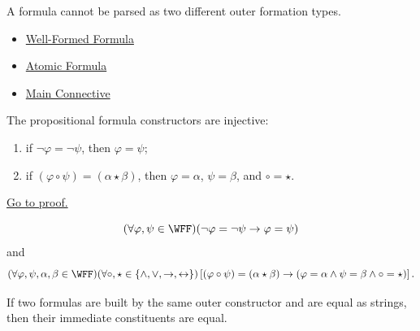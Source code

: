\begin{remark*}[Interpretation]
A formula cannot be parsed as two different outer formation types.
\end{remark*}

\begin{dependencies}
\begin{itemize}
  \item \hyperref[def:well-formed-formula]{Well-Formed Formula}
  \item \hyperref[def:atomic-formula-propositional-logic]{Atomic Formula}
  \item \hyperref[def:main-connective-propositional-logic]{Main Connective}
\end{itemize}
\end{dependencies}
\begin{tcolorbox}[colback=lembox, colframe=lemborder, arc=2pt,
  left=6pt, right=6pt, top=4pt, bottom=4pt,
  title={\small\textbf{Lemma (Constructor Injectivity for Propositional Formulas)}},
  fonttitle=\small\bfseries]
\begin{lemma}
\label{lem:constructor-injectivity-propositional-formulas}
The propositional formula constructors are injective:
\begin{enumerate}
\item if \(\neg\varphi=\neg\psi\), then \(\varphi=\psi\);
\item if \((\varphi\circ\psi)=(\alpha\star\beta)\), then \(\varphi=\alpha\), \(\psi=\beta\), and \(\circ=\star\).
\end{enumerate}

\noindent\hyperref[prf:constructor-injectivity-propositional-formulas]{Go to proof.}
\end{lemma}
\end{tcolorbox}

\begin{remark*}
\[
(\forall\varphi,\psi\in\WFF)
(\neg\varphi=\neg\psi\to\varphi=\psi)
\]
and
\[
(\forall\varphi,\psi,\alpha,\beta\in\WFF)
(\forall\circ,\star\in\{\land,\lor,\to,\leftrightarrow\})
\left[
(\varphi\circ\psi)=(\alpha\star\beta)
\to
(\varphi=\alpha\land\psi=\beta\land\circ=\star)
\right].
\]
\end{remark*}

\begin{remark*}[Interpretation]
If two formulas are built by the same outer constructor and are equal as strings, then their immediate constituents are equal.
\end{remark*}

